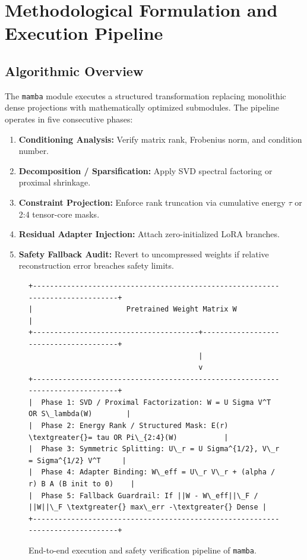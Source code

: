 \section{Methodological Formulation and Execution Pipeline}

\subsection{Algorithmic Overview}
The \texttt{mamba} module executes a structured transformation replacing monolithic dense projections with mathematically optimized submodules. The pipeline operates in five consecutive phases:
\begin{enumerate}
\item \textbf{Conditioning Analysis:} Verify matrix rank, Frobenius norm, and condition number.
\item \textbf{Decomposition / Sparsification:} Apply SVD spectral factoring or proximal shrinkage.
\item \textbf{Constraint Projection:} Enforce rank truncation via cumulative energy $\tau$ or 2:4 tensor-core masks.
\item \textbf{Residual Adapter Injection:} Attach zero-initialized LoRA branches.
\item \textbf{Safety Fallback Audit:} Revert to uncompressed weights if relative reconstruction error breaches safety limits.
\end{enumerate}

\begin{figure}[t]
\centering
\begin{verbatim}
+-------------------------------------------------------------------------------+
|                      Pretrained Weight Matrix W                               |
+---------------------------------------+---------------------------------------+
                                        |
                                        v
+-------------------------------------------------------------------------------+
|  Phase 1: SVD / Proximal Factorization: W = U Sigma V^T OR S\_lambda(W)        |
|  Phase 2: Energy Rank / Structured Mask: E(r) \textgreater{}= tau OR Pi\_{2:4}(W)           |
|  Phase 3: Symmetric Splitting: U\_r = U Sigma^{1/2}, V\_r = Sigma^{1/2} V^T     |
|  Phase 4: Adapter Binding: W\_eff = U\_r V\_r + (alpha / r) B A (B init to 0)    |
|  Phase 5: Fallback Guardrail: If ||W - W\_eff||\_F / ||W||\_F \textgreater{} max\_err -\textgreater{} Dense |
+-------------------------------------------------------------------------------+
\end{verbatim}
\caption{End-to-end execution and safety verification pipeline of \texttt{mamba}.}
\end{figure}

